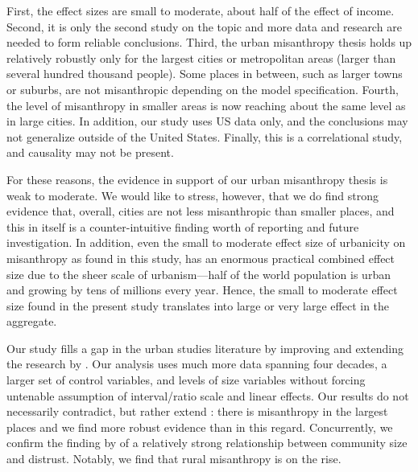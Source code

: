 \documentclass[11pt, letterpaper]{article}
\begin{document}
\begin{spacing}{1.4}
First, the effect sizes are small to moderate, about half of the
effect of income. Second, it is only the second study  \citep[after][]{wilson85}
on the topic and more data and research are needed to form  reliable
conclusions. Third, the urban 
misanthropy thesis holds up relatively robustly only for the largest cities or metropolitan areas (larger than several hundred thousand people). Some places in between, such as larger towns or suburbs, are not misanthropic depending on the model specification. Fourth,
the level of misanthropy in smaller areas is now reaching about the same level
as in large cities. In addition, our study uses US data only, and the conclusions may not generalize outside of the United States. Finally, this is a correlational study, and causality may not be present. 
% 

For these reasons, the evidence in support of our urban misanthropy thesis is
 weak to moderate.  We would like to stress, however, that we do find strong evidence that,
 overall,  cities are not less misanthropic than smaller places, and this in
 itself is a counter-intuitive finding worth of reporting and  future investigation.
 In addition, even the small to moderate effect size of urbanicity on misanthropy
 as found in this study, has an enormous practical combined effect size due to the
 sheer scale of urbanism---half of the world population is urban and growing by tens
 of millions every year. Hence, the small to moderate effect size found in the
 present study translates into large or very large effect in the aggregate. 

Our study fills a gap in the urban studies literature by improving and extending the research by \citet{wilson85}. Our analysis uses much more data spanning four decades, a larger set of control variables, and levels of size variables without
forcing untenable assumption of interval/ratio scale and linear effects. Our
results do not necessarily contradict, but rather extend \citet{wilson85}: there
is misanthropy in the largest places %
and we find more robust evidence than \citet{wilson85} in this regard. Concurrently, we confirm the finding by \citet{fischer81} of a relatively strong relationship between community size and distrust. Notably, we find that rural misanthropy is on the rise.



\end{spacing}
\end{document}

